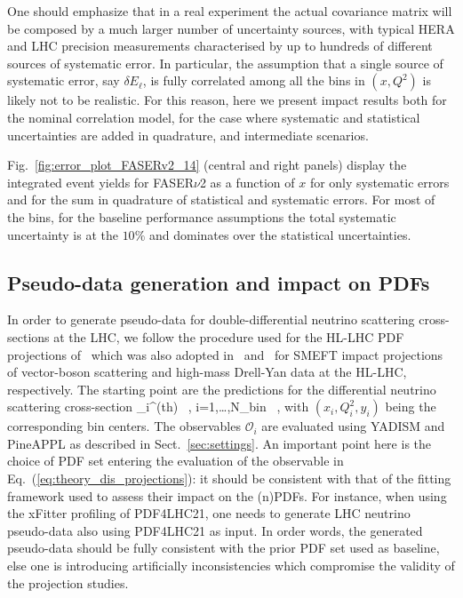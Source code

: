  One should emphasize that in a real experiment the actual covariance matrix will be
 composed by a much larger number of uncertainty sources, with typical
  HERA and LHC precision measurements characterised by up to hundreds
 of different sources of systematic error.
 In particular, the assumption that a single source of systematic error, say $\delta E_\ell$,
 is fully correlated among all the bins in $(x,Q^2)$ is likely not to be realistic.
 For this reason, here we present impact results both for the nominal correlation model,
 for the case where systematic and statistical uncertainties are added in quadrature,
 and intermediate scenarios.
  
 Fig.~\ref{fig:error_plot_FASERv2_14} (central and right panels) display
 the integrated event yields for FASER$\nu$2 as a function of $x$ for only
 systematic errors and for the sum in quadrature of statistical and systematic errors.
 For most of the bins, for the baseline performance assumptions the total systematic
 uncertainty is at the $10\%$ and dominates over the statistical uncertainties.
 
 \subsection{Pseudo-data generation and impact on PDFs}

 In order to generate pseudo-data for double-differential
 neutrino scattering cross-sections at the LHC, we follow the procedure
 used for the HL-LHC PDF projections of~\cite{AbdulKhalek:2018rok} which was
 also adopted in~\cite{Ethier:2021ydt} and~\cite{Greljo:2021kvv} for SMEFT impact projections
 of vector-boson scattering and high-mass Drell-Yan data at the HL-LHC, respectively.
 The starting point are the predictions for the differential neutrino scattering
 cross-section
 \be
 \label{eq:theory_dis_projections}
 _i^{{\rm (th)}} \equiv {} \, ,\quad
 i=1,\ldots,N_{\rm bin} \, ,
 \ee
 with $(x_i,Q^2_i,y_i)$ being the corresponding bin centers.
 The observables $\mathcal{O}_i $ are evaluated using {\sc\small YADISM} and {\sc\small PineAPPL}
 as described in Sect.~\ref{sec:settings}.
 An important point here is the choice of PDF set entering the evaluation of
 the observable in Eq.~(\ref{eq:theory_dis_projections}): it should be consistent
 with that of the fitting framework used to assess their impact on the (n)PDFs.
 For instance, when using the {\sc\small xFitter} profiling of PDF4LHC21, one needs
 to generate LHC neutrino pseudo-data also using PDF4LHC21 as input.
 In order words, the generated pseudo-data should be fully consistent with the prior PDF
 set used as baseline, else one is introducing artificially inconsistencies which
 compromise the validity of the projection studies.
 
